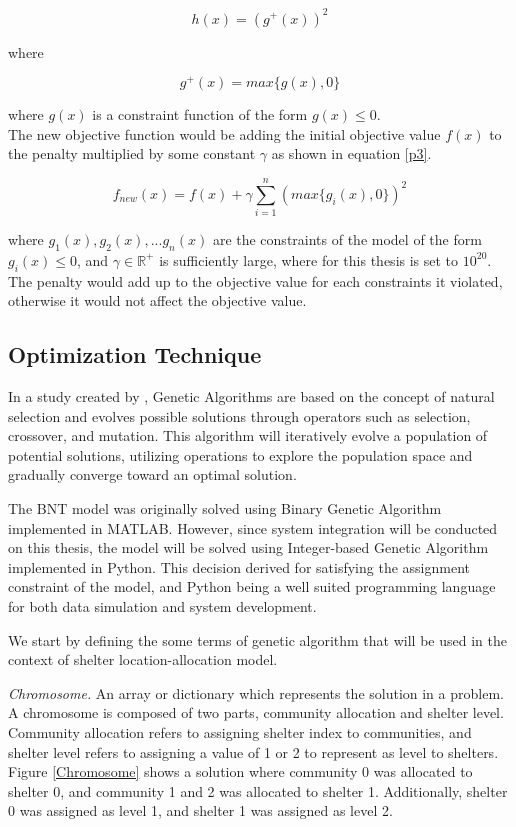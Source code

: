 	\begin{equation} 
		\label{p1}
		h(x)=(g^+(x))^2
	\end{equation}
	
	where
	
	\begin{equation} 
		\label{p2}
		g^+(x)=max\{g(x),0\}
	\end{equation}
	
	where $g(x)$ is a constraint function of the form $g(x)\le0$. 
	\\
	The new objective function would be adding the initial objective value $f(x)$ to the penalty multiplied by some constant $\gamma$ as shown in equation \ref{p3}.
	
	\begin{equation} 
		\label{p3}
		f_{new}(x)=f(x)+\gamma\sum_{i=1}^{n}(max\{g_i(x),0\})^2
	\end{equation}
	
	where $g_1(x),g_2(x),...g_n(x)$ are the constraints of the model of the form $g_i(x)\le0$, and $\gamma\in\mathbb{R}^+$ is sufficiently large, where for this thesis is set to $10^{20}$. The penalty would add up to the objective value for each constraints it violated, otherwise it would not affect the objective value.	
	
\subsection{Optimization Technique}
	In a study created by \textcite{Mathew2012}, Genetic Algorithms are based on the concept of natural selection and evolves possible solutions through operators such as selection, crossover, and mutation. This algorithm will iteratively evolve a population of potential solutions, utilizing operations to explore the population space and gradually converge toward an optimal solution.
	
	The BNT model was originally solved using Binary Genetic Algorithm implemented in MATLAB. However, since system integration will be conducted on this thesis, the model will be solved using Integer-based Genetic Algorithm implemented in Python. This decision derived for satisfying the assignment constraint of the model, and Python being a well suited programming language for both data simulation and system development.
	
	We start by defining the some terms of genetic algorithm that will be used in the context of shelter location-allocation model.
	
	\textit{Chromosome.}  An array or dictionary which represents the  solution in a problem. A chromosome is composed of two parts, community allocation and shelter level. Community allocation refers to assigning shelter index to communities, and shelter level refers to assigning a value of 1 or 2 to represent as level to shelters. Figure \ref{Chromosome} shows a solution where community 0 was allocated to shelter 0, and community 1 and 2 was allocated to shelter 1. Additionally, shelter 0 was assigned as level 1, and shelter 1 was assigned as level 2.
	
